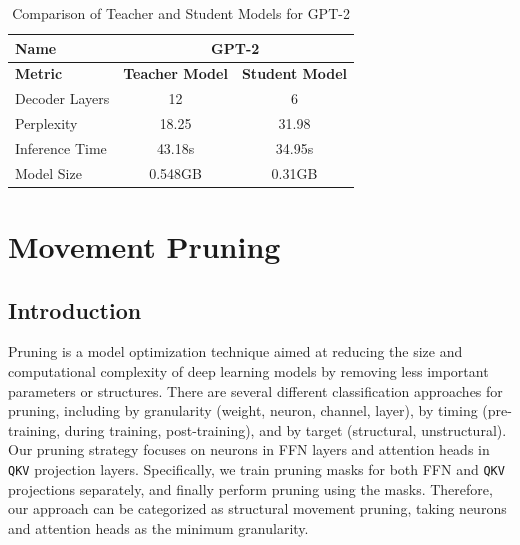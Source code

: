 \documentclass{article}
\begin{document}
    \begin{table}[h!]
        \centering
        \begin{tabular}{lcc}
            \toprule
            \textbf{Name}         & \multicolumn{2}{c}{\textbf{GPT-2}} \\ \midrule
            \textbf{Metric}       & \textbf{Teacher Model} & \textbf{Student Model} \\ \midrule
            Decoder Layers        & 12                     & 6                     \\
            Perplexity            & 18.25                  & 31.98                  \\
            Inference Time        & 43.18s                 & 34.95s                 \\
            Model Size            & 0.548GB                & 0.31GB                 \\ \bottomrule
        \end{tabular}
        \caption{Comparison of Teacher and Student Models for GPT-2}
        \label{tab:gpt2_comparison}
    \end{table}



    \section{Movement Pruning}
    \subsection{Introduction}
    \hspace*{1em} Pruning is a model optimization technique aimed at reducing the size and computational complexity of deep learning models by removing less important parameters or structures. There are several different classification approaches for pruning, including by granularity (weight, neuron, channel, layer), by timing (pre-training, during training, post-training), and by target (structural, unstructural). Our pruning strategy focuses on neurons in FFN layers and attention heads in \texttt{QKV} projection layers. Specifically, we train pruning masks for both FFN and \texttt{QKV} projections separately, and finally perform pruning using the masks. Therefore, our approach can be categorized as structural movement pruning, taking neurons and attention heads as the minimum granularity.
\end{document}
